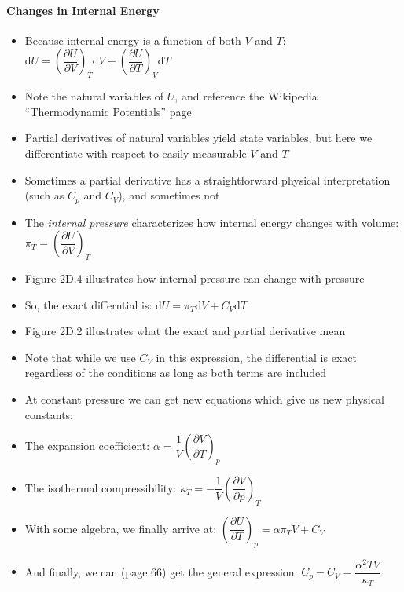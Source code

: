 \documentclass[12pt, openany, letterpaper]{memoir}
\begin{document}
\paragraph{Changes in Internal Energy}
\begin{itemize}
	\item Because internal energy is a function of both $V$ and $T$: $\mathrm{d}U = \left(\dfrac{\partial U}{\partial V}\right)_T\mathrm{d}V + \left(\dfrac{\partial U}{\partial T}\right)_V\mathrm{d}T$
	\item Note the natural variables of $U$, and reference the Wikipedia ``Thermodynamic Potentials'' page
	\item Partial derivatives of natural variables yield state variables, but here we differentiate with respect to easily measurable $V$ and $T$
	\item Sometimes a partial derivative has a straightforward physical interpretation (such as $C_p$ and $C_V$), and sometimes not
	\item The \emph{internal pressure} characterizes how internal energy changes with volume: $\pi_T = \left(\dfrac{\partial U}{\partial V}\right)_T$
	\item Figure 2D.4 illustrates how internal pressure can change with pressure
	\item So, the exact differntial is: $\mathrm{d}U = \pi_T\mathrm{d}V + C_V\mathrm{d}T$
	\item Figure 2D.2 illustrates what the exact and partial derivative mean
	\item Note that while we use $C_V$ in this expression, the differential is exact regardless of the conditions as long as both terms are included
	\item At constant pressure we can get new equations which give us new physical constants:
	\item The expansion coefficient: $\alpha = \dfrac{1}{V}\left(\dfrac{\partial V}{\partial T}\right)_p$ 
	\item The isothermal compressibility: $\kappa_T = -\dfrac{1}{V}\left(\dfrac{\partial V}{\partial p}\right)_T$
	\item With some algebra, we finally arrive at: $\left(\dfrac{\partial U}{\partial T}\right)_p = \alpha\pi_T V + C_V$
	\item And finally, we can (page 66) get the general expression: $C_p-C_V = \dfrac{\alpha^2 TV}{\kappa_T}$
\end{itemize}
\end{document}
